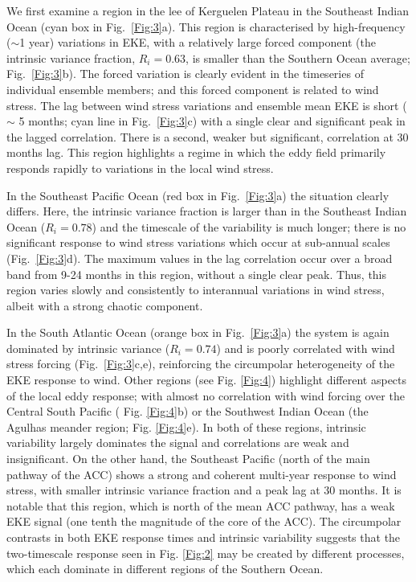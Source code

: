 \documentclass[linenumbers]{agujournal2019}
\begin{document}
We first examine a region in the lee of Kerguelen Plateau in the Southeast Indian Ocean (cyan box in Fig.~\ref{Fig:3}a).
This region is characterised by high-frequency ($\sim$1 year) variations in EKE, with a relatively large forced component (the intrinsic variance fraction, $R_i = 0.63$, is smaller than the Southern Ocean average; Fig.~\ref{Fig:3}b).
The forced variation is clearly evident in the timeseries of  individual ensemble members; and this forced component is related to wind stress.
The lag between wind stress variations and ensemble mean EKE is short ($\sim$ 5 months; cyan line in Fig.~\ref{Fig:3}c) with a single clear  and significant peak in the lagged correlation.
There is a second, weaker but significant, correlation at 30 months lag.
This region highlights a regime in which the eddy field primarily responds rapidly to variations in the local wind stress.

In the Southeast Pacific Ocean (red box in Fig.~\ref{Fig:3}a) the situation clearly differs.
Here, the intrinsic variance fraction is larger than in the Southeast Indian Ocean ($R_i=0.78$) and the timescale of the variability is much longer; there is no significant response to wind stress variations which occur at sub-annual scales (Fig.~\ref{Fig:3}d).
The maximum values in the lag correlation occur over a broad band from 9-24 months in this region, without a single clear peak.
Thus, this region varies slowly and consistently to interannual variations in wind stress, albeit with a strong chaotic component.

In the South Atlantic Ocean (orange box in Fig.~\ref{Fig:3}a) the system is again dominated by intrinsic variance ($R_i=0.74$) and is poorly correlated with wind stress forcing (Fig.~\ref{Fig:3}c,e), reinforcing the circumpolar heterogeneity of the EKE response to wind.
Other regions (see Fig. \ref{Fig:4}) highlight different aspects of the local eddy response;  with almost no correlation with wind forcing over the Central South Pacific ( Fig. \ref{Fig:4}b) or the Southwest Indian Ocean  (the Agulhas meander region; Fig. \ref{Fig:4}e).
In both of these regions, intrinsic variability largely dominates the signal and correlations are weak and insignificant. 
On the other hand, the Southeast Pacific (north of the main pathway of the ACC) shows a strong and coherent multi-year response to wind stress, with smaller intrinsic variance fraction and a peak lag at 30 months.
It is notable that this region, which is north of the mean ACC pathway, has a weak EKE signal (one tenth the magnitude of the core of the ACC).
The circumpolar contrasts in both EKE response times and intrinsic variability suggests that the two-timescale response seen in Fig. \ref{Fig:2} may be created by different processes, which each dominate in different regions of the Southern Ocean.
\end{document}
